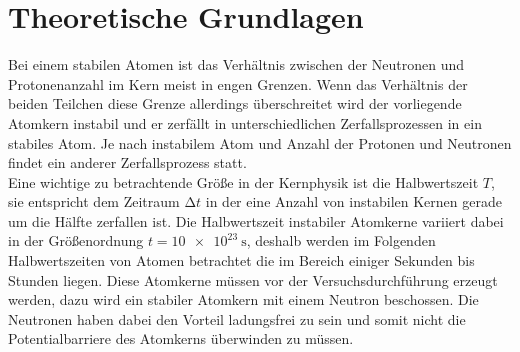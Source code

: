\section{Theoretische Grundlagen}

Bei einem stabilen Atomen ist das Verhältnis zwischen der Neutronen und Protonenanzahl im Kern meist in engen Grenzen.
Wenn das Verhältnis der beiden Teilchen diese Grenze allerdings überschreitet wird der vorliegende Atomkern instabil und er zerfällt in 
unterschiedlichen Zerfallsprozessen in ein stabiles Atom. Je nach instabilem Atom und Anzahl der Protonen und Neutronen findet ein anderer
Zerfallsprozess statt.
\\
\newline
Eine wichtige zu betrachtende Größe in der Kernphysik ist die Halbwertszeit $T$, sie entspricht dem Zeitraum $\increment t$ in der eine Anzahl von instabilen
Kernen gerade um die Hälfte zerfallen ist. Die Halbwertszeit instabiler Atomkerne variiert dabei in der Größenordnung 
$t = \SI{10e23}{\second}$, deshalb werden im Folgenden Halbwertszeiten von Atomen betrachtet die im Bereich einiger Sekunden bis Stunden liegen.
Diese Atomkerne müssen vor der Versuchsdurchführung erzeugt werden, dazu wird ein stabiler Atomkern mit einem Neutron beschossen. Die Neutronen haben dabei
den Vorteil ladungsfrei zu sein und somit nicht die Potentialbarriere des Atomkerns überwinden zu müssen.

